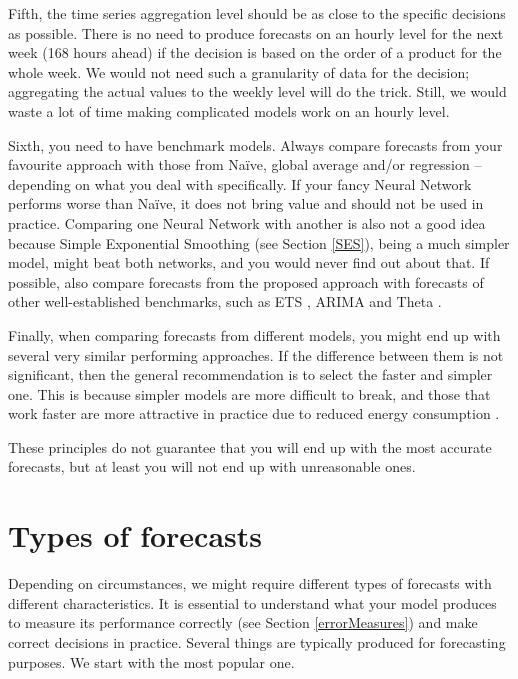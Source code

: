 \documentclass[
]{book}
\theoremstyle{definition}
\theoremstyle{definition}
\theoremstyle{definition}
\theoremstyle{definition}
\theoremstyle{remark}
\begin{document}
Fifth, the time series aggregation level should be as close to the specific decisions as possible. There is no need to produce forecasts on an hourly level for the next week (168 hours ahead) if the decision is based on the order of a product for the whole week. We would not need such a granularity of data for the decision; aggregating the actual values to the weekly level will do the trick. Still, we would waste a lot of time making complicated models work on an hourly level.

Sixth, you need to have benchmark models. Always compare forecasts from your favourite approach with those from Naïve, global average and/or regression -- depending on what you deal with specifically. If your fancy Neural Network performs worse than Naïve, it does not bring value and should not be used in practice. Comparing one Neural Network with another is also not a good idea because Simple Exponential Smoothing (see Section \ref{SES}), being a much simpler model, might beat both networks, and you would never find out about that. If possible, also compare forecasts from the proposed approach with forecasts of other well-established benchmarks, such as ETS \citep{Hyndman2008b}, ARIMA \citep{Box1976} and Theta \citep{Assimakopoulos2000}.

Finally, when comparing forecasts from different models, you might end up with several very similar performing approaches. If the difference between them is not significant, then the general recommendation is to select the faster and simpler one. This is because simpler models are more difficult to break, and those that work faster are more attractive in practice due to reduced energy consumption \citep[save the planet and stop global warming!][]{Dhar2020}.

These principles do not guarantee that you will end up with the most accurate forecasts, but at least you will not end up with unreasonable ones.

\hypertarget{typesOfForecasts}{%
\section{Types of forecasts}\label{typesOfForecasts}}

Depending on circumstances, we might require different types of forecasts with different characteristics. It is essential to understand what your model produces to measure its performance correctly (see Section \ref{errorMeasures}) and make correct decisions in practice. Several things are typically produced for forecasting purposes. We start with the most popular one.
\end{document}

